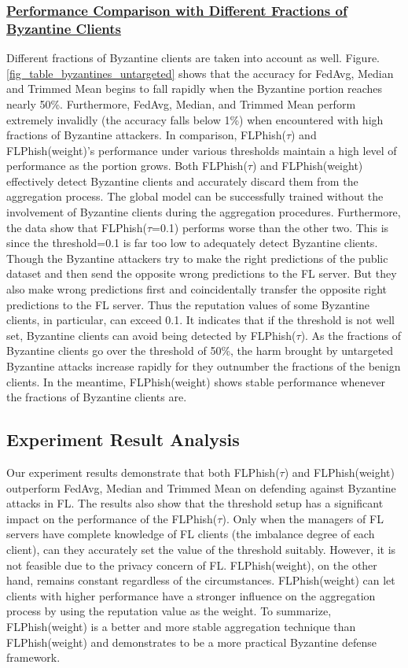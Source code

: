 \documentclass[lettersize,journal]{IEEEtran}
\begin{document}
    \subsubsection{\ul{Performance Comparison with Different Fractions of Byzantine Clients}} Different fractions of Byzantine clients are taken into account as well. Figure. \ref{fig_table_byzantines_untargeted} shows that the accuracy for FedAvg, Median and Trimmed Mean begins to fall rapidly when the Byzantine portion reaches nearly 50\%. Furthermore, FedAvg, Median, and Trimmed Mean perform extremely invalidly (the accuracy falls below 1\%) when encountered with high fractions of Byzantine attackers. In comparison, FLPhish($\tau$) and FLPhish(weight)'s performance under various thresholds maintain a high level of performance as the portion grows. Both FLPhish($\tau$) and FLPhish(weight) effectively detect Byzantine clients and accurately discard them from the aggregation process. The global model can be successfully trained without the involvement of Byzantine clients during the aggregation procedures. Furthermore, the data show that FLPhish($\tau$=0.1) performs worse than the other two. This is since the threshold=0.1 is far too low to adequately detect Byzantine clients. Though the Byzantine attackers try to make the right predictions of the public dataset and then send the opposite wrong predictions to the FL server. But they also make wrong predictions first and coincidentally transfer the opposite right predictions to the FL server. Thus the reputation values of some Byzantine clients, in particular, can exceed 0.1. It indicates that if the threshold is not well set, Byzantine clients can avoid being detected by FLPhish($\tau$). As the fractions of Byzantine clients go over the threshold of 50\%, the harm brought by untargeted Byzantine attacks increase rapidly for they outnumber the fractions of the benign clients. In the meantime, FLPhish(weight) shows stable performance whenever the fractions of Byzantine clients are.

    \subsection{{Experiment Result Analysis}} Our experiment results demonstrate that both FLPhish($\tau$) and FLPhish(weight) outperform FedAvg, Median \cite{ref_13_defense} and Trimmed Mean \cite{ref_13_defense} on defending against Byzantine attacks in FL. The results also show that the threshold setup has a significant impact on the performance of the FLPhish($\tau$). Only when the managers of FL servers have complete knowledge of FL clients (the imbalance degree of each client), can they accurately set the value of the threshold suitably. However, it is not feasible due to the privacy concern of FL. FLPhish(weight), on the other hand, remains constant regardless of the circumstances. FLPhish(weight) can let clients with higher performance have a stronger influence on the aggregation process by using the reputation value as the weight. To summarize, FLPhish(weight) is a better and more stable aggregation technique than FLPhish(weight) and demonstrates to be a more practical Byzantine defense framework.
\end{document}
